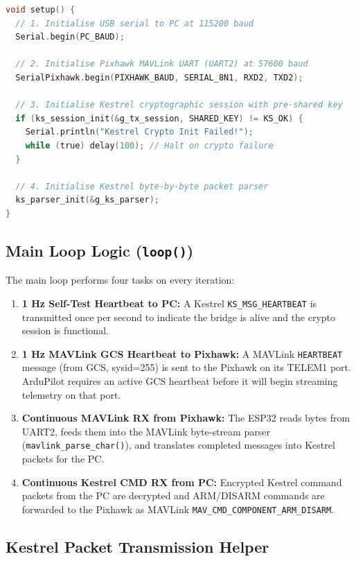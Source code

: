 \documentclass[11pt,a4paper]{article}
\begin{document}
\begin{lstlisting}[language=C, style=cstyle,
    caption={ESP32 Bridge Initialisation (setup())}]
void setup() {
  // 1. Initialise USB serial to PC at 115200 baud
  Serial.begin(PC_BAUD);

  // 2. Initialise Pixhawk MAVLink UART (UART2) at 57600 baud
  SerialPixhawk.begin(PIXHAWK_BAUD, SERIAL_8N1, RXD2, TXD2);

  // 3. Initialise Kestrel cryptographic session with pre-shared key
  if (ks_session_init(&g_tx_session, SHARED_KEY) != KS_OK) {
    Serial.println("Kestrel Crypto Init Failed!");
    while (true) delay(100); // Halt on crypto failure
  }

  // 4. Initialise Kestrel byte-by-byte packet parser
  ks_parser_init(&g_ks_parser);
}
\end{lstlisting}

\subsection{Main Loop Logic (\texttt{loop()})}

The main loop performs four tasks on every iteration:

\begin{enumerate}
    \item \textbf{1 Hz Self-Test Heartbeat to PC:} A Kestrel \texttt{KS\_MSG\_HEARTBEAT}
          is transmitted once per second to indicate the bridge is alive and the
          crypto session is functional.
    \item \textbf{1 Hz MAVLink GCS Heartbeat to Pixhawk:} A MAVLink
          \texttt{HEARTBEAT} message (from GCS, sysid=255) is sent to the Pixhawk
          on its TELEM1 port. ArduPilot requires an active GCS heartbeat before it
          will begin streaming telemetry on that port.
    \item \textbf{Continuous MAVLink RX from Pixhawk:} The ESP32 reads bytes
          from UART2, feeds them into the MAVLink byte-stream parser
          (\texttt{mavlink\_parse\_char()}), and translates completed messages into
          Kestrel packets for the PC.
    \item \textbf{Continuous Kestrel CMD RX from PC:} Encrypted Kestrel command
          packets from the PC are decrypted and ARM/DISARM commands are forwarded
          to the Pixhawk as MAVLink \texttt{MAV\_CMD\_COMPONENT\_ARM\_DISARM}.
\end{enumerate}

\subsection{Kestrel Packet Transmission Helper}
\end{document}
